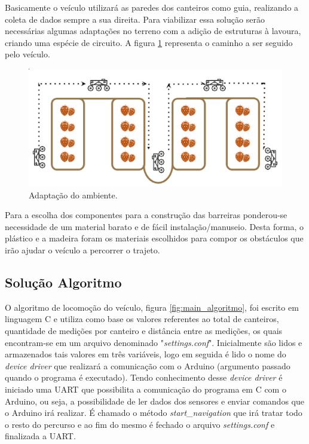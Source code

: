     \vfill
    \pagebreak

    Basicamente o veículo utilizará as paredes dos canteiros como guia, realizando a
    coleta de dados sempre a sua direita. Para viabilizar essa solução serão necessárias algumas adaptações no terreno com a adição de estruturas à lavoura, criando uma espécie de circuito. A figura \ref{fig:ambientadapt} representa o caminho a ser seguido pelo veículo.

    \begin{figure}[!htbp]
    \begin{center}
    \includegraphics[width=.7\textwidth]{figuras/adapt.eps}
    \caption{\label{fig:ambientadapt}Adaptação do ambiente.}
    \end{center}
    \end{figure}

    \vfill
    \pagebreak

    Para a escolha dos componentes para a construção das barreiras ponderou-se
    necessidade de um material barato e de fácil instalação/manuseio.
    Desta forma, o plástico e a madeira foram os materiais escolhidos para compor os obstáculos
    que irão ajudar o veículo a percorrer o trajeto.

  \subsection{Solução Algoritmo}
  O algoritmo de locomoção do veículo, figura \ref{fig:main_algoritmo}, foi escrito em linguagem C e utiliza como base os valores referentes
  ao total de canteiros, quantidade de medições por canteiro e distância entre as medições, os quais
  encontram-se em um arquivo denominado "\textit{settings.conf}". Inicialmente são lidos e armazenados tais valores
  em três variáveis, logo em seguida é lido o nome do \textit{device driver} que realizará a comunicação com o Arduino (argumento passado quando o programa é executado). Tendo conhecimento desse \textit{device driver} é iniciado uma UART que possibilita a comunicação do programa em C com o Arduino, ou seja, a possibilidade de ler dados dos sensores e enviar comandos que o Arduino irá realizar. É chamado o método \textit{start\_navigation} que irá tratar todo o resto do percurso e ao fim do mesmo é fechado o arquivo \textit{settings.conf} e finalizada a UART.

